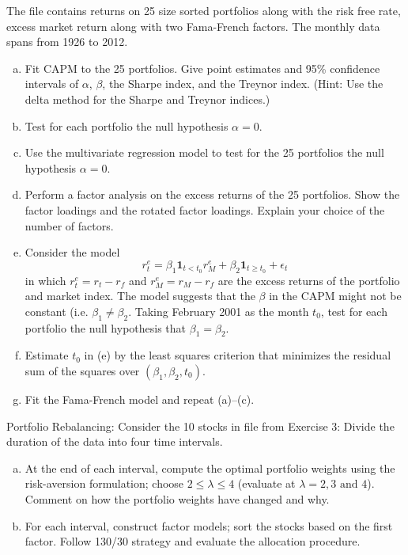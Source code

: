\prob The file  contains returns on 25 size sorted portfolios along with the risk free rate, excess market return along with two Fama-French factors. The monthly data spans from 1926 to 2012.
	\begin{enumerate}[(a)]
	\item Fit CAPM to the 25 portfolios. Give point estimates and 95\% confidence intervals of $\alpha$, $\beta$, the Sharpe index, and the Treynor index. (Hint: Use the delta method for the Sharpe and Treynor indices.)
	\item Test for each portfolio the null hypothesis $\alpha= 0$.
	\item Use the multivariate regression model to test for the 25 portfolios the null hypothesis $\alpha=0$.
	\item Perform a factor analysis on the excess returns of the 25 portfolios. Show the factor loadings and the rotated factor loadings. Explain your choice of the number of factors.
	\item Consider the model
		\[
		r_t^e= \beta_1 \mathbf{1}_{t<t_0} r_M^e + \beta_2 \mathbf{1}_{t\geq t_0} + \epsilon_t
		\]
	in which $r_t^e=r_t-r_f$ and $r_M^e=r_M-r_f$ are the excess returns of the portfolio and market index. The model suggests that the $\beta$ in the CAPM might not be constant (i.e. $\beta_1\neq\beta_2$. Taking February 2001 as the month $t_0$, test for each portfolio the null hypothesis that $\beta_1=\beta_2$.
	\item Estimate $t_0$ in (e) by the least squares criterion that minimizes the residual sum of the squares over $(\beta_1,\beta_2,t_0)$.
	\item Fit the Fama-French model and repeat (a)--(c). \twomedskip
	\end{enumerate}


\prob Portfolio Rebalancing: Consider the 10 stocks in file from Exercise 3: Divide the duration of the data into four time intervals.
    \begin{enumerate}[(a)]
    \item At the end of each interval, compute the optimal portfolio weights using the risk-aversion formulation; choose $2 \leq \lambda \leq 4$ (evaluate at $\lambda = 2, 3 \text{ and } 4$). Comment on how the portfolio weights have changed and why.
    \item For each interval, construct factor models; sort the stocks based on the first factor. Follow 130/30 strategy and evaluate the allocation procedure. \twomedskip
    \end{enumerate}
    
